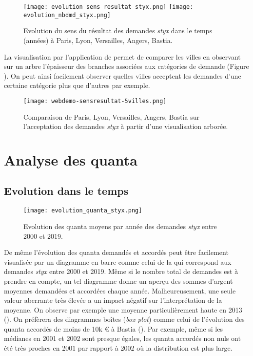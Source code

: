 \begin{figure}%
	\centering 
	\texttt{[image: evolution\_sens\_resultat\_styx.png]}
	\texttt{[image: evolution\_nbdmd\_styx.png]}
	\caption{Evolution du sens du résultat des demandes \textit{styx} dans le temps (années) à Paris, Lyon, Versailles, Angers, Bastia.}\label{fig:demo:analyse-sens-resultat-styx}
\end{figure}

La visualisation par l'application de \citet{PRYSIAZHNIUK2017jurisprudence-demo-web} permet de comparer les villes en observant sur un arbre l'épaisseur des branches associées aux catégories de demande (Figure ). On peut ainsi facilement observer quelles villes acceptent les demandes d'une certaine catégorie plus que d'autres par exemple.


\begin{figure}[!htb]
	\centering 
	\texttt{[image: webdemo-sensresultat-5villes.png]}
	\caption{Comparaison de Paris, Lyon, Versailles, Angers, Bastia sur l'acceptation des demandes \textit{styx} à partir d'une visualisation arborée.}\label{fig:demo:web-styx}
\end{figure}

\section{Analyse des quanta}
\subsection{Evolution dans le temps}
\begin{figure}[!htb]
	\centering 
	\texttt{[image: evolution\_quanta\_styx.png]}
	\caption{Evolution des quanta moyens par année des demandes \textit{styx} entre  2000  et 2019.}\label{fig:demo:evolution-quanta-styx}
\end{figure}

De même l'évolution des quanta demandés et accordés peut être facilement visualisée par un diagramme en barre comme celui de la  qui correspond aux demandes \textit{styx} entre 2000  et 2019. Même si le nombre total de demandes est à prendre en compte, un tel diagramme donne un aperçu des sommes d'argent moyennes demandées et accordées chaque année. Malheureusement, une seule valeur aberrante très élevée a un impact négatif sur l'interprétation de la moyenne. On observe par exemple une moyenne particulièrement haute en 2013  (). On préfèrera des diagrammes boîtes (\textit{box plot}) comme celui de l'évolution des quanta accordés de moins de 10k \euro{} à Bastia (). Par exemple, même si les médianes en 2001 et 2002 sont presque égales, les quanta accordés non nuls ont été très proches en 2001 par rapport à 2002 où la distribution est plus large.

